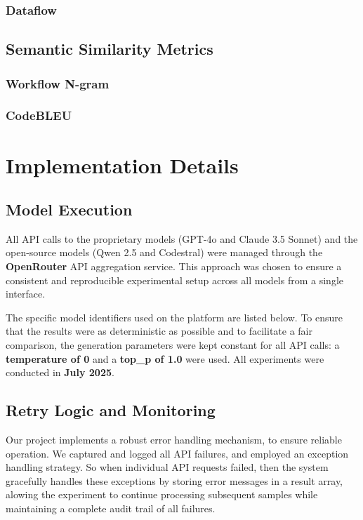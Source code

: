 \subsubsection{Dataflow}

\subsection{Semantic Similarity Metrics}
\subsubsection{Workflow N-gram}

\subsubsection{CodeBLEU}


\section{Implementation Details}
\subsection{Model Execution}
\label{sec:implementation-details}

All API calls to the proprietary models (GPT-4o and Claude 3.5 Sonnet) and the open-source models (Qwen 2.5 and Codestral) were managed through the \textbf{OpenRouter} API aggregation service. This approach was chosen to ensure a consistent and reproducible experimental setup across all models from a single interface.

The specific model identifiers used on the platform are listed below. To ensure that the results were as deterministic as possible and to facilitate a fair comparison, the generation parameters were kept constant for all API calls: a \textbf{temperature of 0} and a \textbf{top\_p of 1.0} were used. All experiments were conducted in \textbf{July 2025}.
\subsection{Retry Logic and Monitoring}

Our project implements a robust error handling mechanism, to ensure reliable operation. We captured and logged all API failures, and employed an exception handling strategy. So when individual API requests failed, then the system gracefully handles these exceptions by storing error messages in a result array, alowing the experiment to continue processing subsequent samples while maintaining a complete audit trail of all failures.

